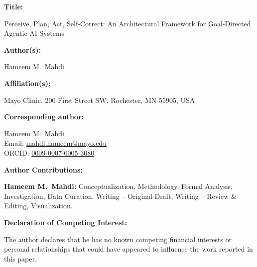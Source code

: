 \documentclass[12pt]{article}
\begin{document}
\noindent\textbf{Title:}

Perceive, Plan, Act, Self-Correct: An Architectural Framework for Goal-Directed Agentic AI Systems

\bigskip

\noindent\textbf{Author(s):}

Hameem M.\ Mahdi 

\bigskip

\noindent\textbf{Affiliation(s):}

Mayo Clinic, 200 First Street SW, Rochester, MN 55905, USA

\bigskip

\noindent\textbf{Corresponding author:}

Hameem M.\ Mahdi \\
Email: \href{mailto:mahdi.hameem@mayo.edu}{mahdi.hameem@mayo.edu} \\
ORCID: \href{https://orcid.org/0009-0007-0005-3080}{0009-0007-0005-3080}

\bigskip

\noindent\textbf{Author Contributions:}

\noindent\textbf{Hameem M.\ Mahdi:}
Conceptualization, Methodology, Formal Analysis, Investigation,
Data Curation, Writing -- Original Draft, Writing -- Review \& Editing,
Visualization.

\bigskip

\noindent\textbf{Declaration of Competing Interest:}

The author declares that he has no known competing financial interests or
personal relationships that could have appeared to influence the work
reported in this paper.
\end{document}
